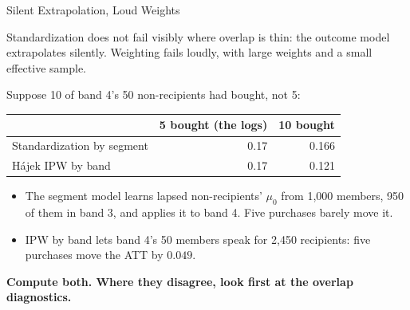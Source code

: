 \documentclass[aspectratio=169, 11pt, handout]{beamer}
\begin{document}
\begin{frame}{Silent Extrapolation, Loud Weights}

Standardization does not fail visibly where overlap is thin: the outcome model extrapolates silently. Weighting fails loudly, with large weights and a small effective sample.

\medskip

Suppose 10 of band 4's 50 non-recipients had bought, not 5:

\begin{center}
\begin{tabular}{lrr}
\toprule
& \textbf{5 bought (the logs)} & \textbf{10 bought} \\
\midrule
Standardization by segment & 0.17 & 0.166 \\
H\'ajek IPW by band & 0.17 & 0.121 \\
\bottomrule
\end{tabular}
\end{center}

\medskip

\begin{itemize}
  \item The segment model learns lapsed non-recipients' $\mu_0$ from 1{,}000 members, 950 of them in band 3, and applies it to band 4. Five purchases barely move it.
  \item IPW by band lets band 4's 50 members speak for 2{,}450 recipients: five purchases move the ATT by $0.049$.
\end{itemize}

\textbf{Compute both. Where they disagree, look first at the overlap diagnostics.}
\end{frame}
\end{document}
